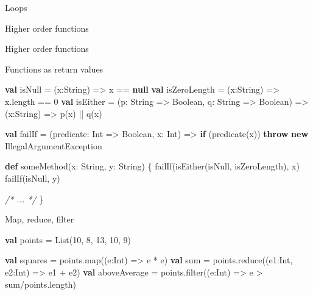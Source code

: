 \documentclass[ignorenonframetext,]{beamer}
\newenvironment{Shaded}{\begin{snugshade}}{\end{snugshade}}
\newcommand{\KeywordTok}[1]{\textcolor[rgb]{0.13,0.29,0.53}{\textbf{#1}}}
\newcommand{\DecValTok}[1]{\textcolor[rgb]{0.00,0.00,0.81}{#1}}
\newcommand{\CommentTok}[1]{\textcolor[rgb]{0.56,0.35,0.01}{\textit{#1}}}
\newcommand{\FunctionTok}[1]{\textcolor[rgb]{0.00,0.00,0.00}{#1}}
\newcommand{\NormalTok}[1]{#1}
\begin{document}
\begin{frame}[fragile]{Loops}
\begin{block}{Higher order functions}
\end{block}

\begin{block}{Higher order functions}

Functions as return values

\begin{Shaded}
\begin{Highlighting}[]
\KeywordTok{val}\NormalTok{ isNull = (x:String) => x == }\KeywordTok{null}
\KeywordTok{val}\NormalTok{ isZeroLength = (x:String) => x.}\FunctionTok{length}\NormalTok{ == }\DecValTok{0}
\KeywordTok{val}\NormalTok{ isEither = (p: String => Boolean, q: String => Boolean) => }
\NormalTok{  (x:String) => }\FunctionTok{p}\NormalTok{(x) || }\FunctionTok{q}\NormalTok{(x)}

\KeywordTok{val}\NormalTok{ failIf = (predicate: Int => Boolean, x: Int) => }
  \KeywordTok{if}\NormalTok{ (}\FunctionTok{predicate}\NormalTok{(x)) }
    \KeywordTok{throw} \KeywordTok{new}\NormalTok{ IllegalArgumentException}
    
\KeywordTok{def} \FunctionTok{someMethod}\NormalTok{(x: String, y: String) \{}
  \FunctionTok{failIf}\NormalTok{(}\FunctionTok{isEither}\NormalTok{(isNull, isZeroLength), x)}
  \FunctionTok{failIf}\NormalTok{(isNull, y)}
  
  \CommentTok{/* ... */}
\NormalTok{\}}
\end{Highlighting}
\end{Shaded}

\end{block}

\begin{block}{Map, reduce, filter}

\begin{Shaded}
\begin{Highlighting}[]
\KeywordTok{val}\NormalTok{ points = List(}\DecValTok{10}\NormalTok{, }\DecValTok{8}\NormalTok{, }\DecValTok{13}\NormalTok{, }\DecValTok{10}\NormalTok{, }\DecValTok{9}\NormalTok{)}
\end{Highlighting}
\end{Shaded}

\begin{Shaded}
\begin{Highlighting}[]
\KeywordTok{val}\NormalTok{ squares = points.}\FunctionTok{map}\NormalTok{((e:Int) => e * e)}
\KeywordTok{val}\NormalTok{ sum = points.}\FunctionTok{reduce}\NormalTok{((e1:Int, e2:Int) => e1 + e2)}
\KeywordTok{val}\NormalTok{ aboveAverage = points.}\FunctionTok{filter}\NormalTok{((e:Int) => e > sum/points.}\FunctionTok{length}\NormalTok{)}
\end{Highlighting}
\end{Shaded}


\end{block}
\end{frame}
\end{document}
